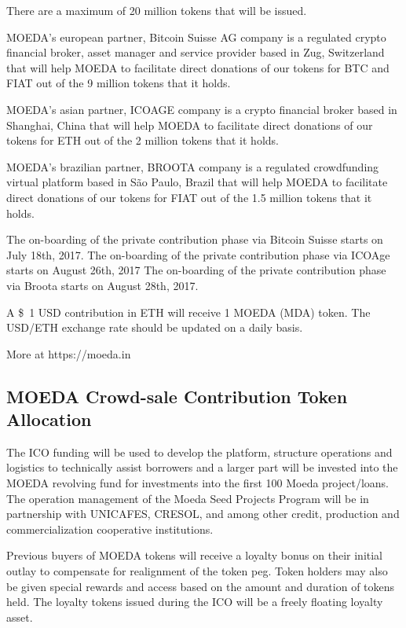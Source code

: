 \documentclass{article}
\begin{document}
There are a maximum of 20 million tokens that will be issued.

MOEDA's european partner, Bitcoin Suisse AG company is a regulated crypto financial broker, asset manager and service provider based in Zug, Switzerland that will help MOEDA to facilitate direct donations of our tokens for BTC and FIAT out of the 9 million tokens that it holds. 

MOEDA's asian partner, ICOAGE company is a crypto financial broker based in Shanghai, China that will help MOEDA to facilitate direct donations of our tokens for ETH  out of the 2 million tokens that it holds. 

MOEDA's brazilian partner, BROOTA company is a regulated crowdfunding virtual platform based in São Paulo, Brazil that will help MOEDA to facilitate direct donations of our tokens for FIAT out of the 1.5 million tokens that it holds. 

The on-boarding of the private contribution phase via Bitcoin Suisse starts on July 18th, 2017.
The on-boarding of the private contribution phase via ICOAge starts on August 26th, 2017
The on-boarding of the private contribution phase via Broota starts on August 28th, 2017.


A \$\ 1 USD contribution in ETH will receive 1 MOEDA (MDA) token. The USD/ETH exchange rate should be updated on a daily basis.
	
More at https://moeda.in


\subsection {MOEDA Crowd-sale Contribution Token Allocation}

The ICO funding will be used to develop the platform, structure operations and logistics to technically assist borrowers and a larger part will be invested into the MOEDA revolving fund for investments into the first 100 Moeda project/loans. The operation management of the Moeda Seed Projects Program will be in partnership with UNICAFES, CRESOL, and among other credit, production and commercialization cooperative institutions.

Previous buyers of MOEDA tokens will receive a loyalty bonus on their initial outlay to compensate for realignment of the token peg. Token holders may also be given special rewards and access based on the amount and duration of tokens held. The loyalty tokens issued during the ICO will be a freely floating loyalty asset. 
\end{document}
